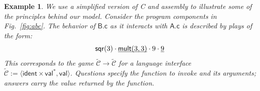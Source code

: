 \documentclass[11pt,oneside,draft]{book}
\newtheorem{example}[theorem]{Example}
\theoremstyle{definition}
\newcommand{\kw}[1]{\ensuremath{ \mathsf{#1} }}
\newcommand{\ul}[1]{%
  \underline{\smash{#1}}
}
\begin{document}
\begin{example} \label{ex:abc} %
We use a simplified version of C and assembly
to illustrate some of the principles behind our model.
Consider the program components in Fig.~\ref{fig:abc}.
The behavior of $\textsf{B.c}$
as it interacts with $\textsf{A.c}$
is described by plays of the form:
\begin{equation} \label{eqn:cplay}
  \mathsf{sqr}(3) \cdot
    \ul{\mathsf{mult}(3,3)} \cdot 9 \cdot \ul{9}
\end{equation}
This corresponds to the game
$\tilde{\mathcal{C}} \rightarrow \tilde{\mathcal{C}}$
for a language interface
$\tilde{\mathcal{C}} :=
 \langle \kw{ident} \times \kw{val}^*, \kw{val} \rangle$.
Questions specify the function to invoke
and its arguments;
answers carry the value returned by the function.


\end{example}
\end{document}
